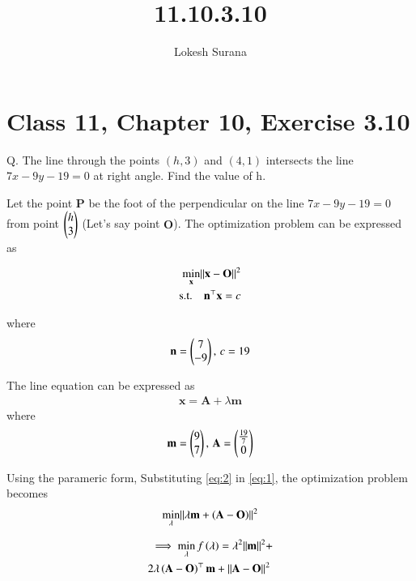 \documentclass[journal,12pt,twocolumn]{IEEEtran}
\renewcommand{\vec}[1]{\boldsymbol{\mathbf{#1}}}
\begin{document}
\vspace{3cm}
\title{11.10.3.10}
\author{Lokesh Surana}
\maketitle
\section*{Class 11, Chapter 10, Exercise 3.10}

Q. The line through the points $(h, 3)$ and $(4, 1)$ intersects the line $7{x} - 9{y} - 19 = 0$ at right angle. Find the value of h.

\solution Let the point $\vec{P}$ be the foot of the perpendicular on the line $7{x} - 9{y} - 19 = 0$ from point $\begin{pmatrix}h\\3\end{pmatrix}$ (Let's say point $\vec{O}$).
The optimization problem can be expressed as

\begin{align}
    \label{eq:1}
    \min_{\vec{x}} \norm{\vec{x}-\vec{O}}^2\\
    \text{s.t.} \quad \vec{n}^\top\vec{x} = c
\end{align}

where
\begin{align}
    \vec{n} = \myvec{7 \\ -9},\,c = 19
\end{align}

The line equation can be expressed as
\begin{align}
    \label{eq:2}
    \vec{x} = \vec{A}+\lambda\vec{m}
\end{align}
where
\begin{align}
    \vec{m} = \myvec{9            \\ 7},\,
    \vec{A} = \myvec{\frac{19}{7} \\ 0}
\end{align}

Using the parameric form, Substituting \eqref{eq:2} in \eqref{eq:1}, the optimization problem becomes
\begin{align}
    \min_{\lambda} \norm{ \lambda\vec{m} +\brak{\vec{A}-\vec{O}}}^2
\end{align}

\begin{align}
    \begin{split}
        \label{eq:3}
        \ \implies \min_{\lambda}f\brak{\lambda} = \lambda^2\norm{\vec{m}}^2 + \\ 2\lambda\brak{\vec{A}-\vec{O}}^\top\vec{m} + \norm{\vec{A}-\vec{O}}^2 \
    \end{split}
\end{align}
\end{document}

